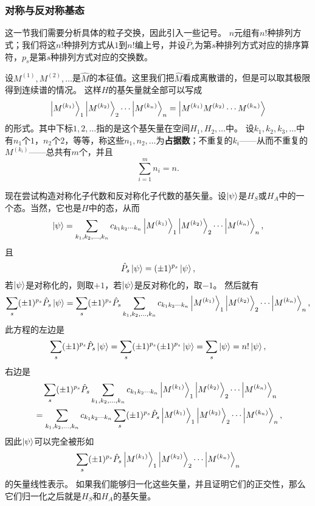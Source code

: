 \documentclass[hyperref, UTF8, a4paper]{ctexart}
\begin{document}
\subsubsection{对称与反对称基态}

这一节我们需要分析具体的粒子交换，因此引入一些记号。
$n$元组有$n!$种排列方式；我们将这$n!$种排列方式从$1$到$n!$编上号，并设$\hat{P}_s$为第$s$种排列方式对应的排序算符，$p_s$是第$s$种排列方式对应的交换数。

设$M^{(1)}, M^{(2)}, \ldots$是$\hat{M}$的本征值。这里我们把$\hat{M}$看成离散谱的，但是可以取其极限得到连续谱的情况。
这样$H$的基矢量就全部可以写成
\[
    \ket{M^{(k_1)}}_1 \ket{M^{(k_2)}}_2 \cdots \ket{M^{(k_n)}}_n = \ket{M^{(k_1)} M^{(k_2)} \cdots M^{(k_n)}}
\]
的形式。其中下标$1, 2, \ldots$指的是这个基矢量在空间$H_1, H_2, \ldots$中。
设$k_1, k_2, k_3, \ldots$中有$n_1$个$1$，$n_2$个$2$，等等，称这些$n_1, n_2, \ldots$为\textbf{占据数}；不重复的$k_i$——从而不重复的$M^{(k_i)}$——总共有$m$个，并且
\begin{equation}
    \sum_{i=1}^m n_i = n.
\end{equation}

现在尝试构造对称化子代数和反对称化子代数的基矢量。设$\ket{\psi}$是$H_S$或$H_A$中的一个态。当然，它也是$H$中的态，从而
\[
    \ket{\psi} = \sum_{k_1, k_2, \ldots, k_n} c_{k_1 k_2 \cdots k_n} \ket{M^{(k_1)}}_1 \ket{M^{(k_2)}}_2 \cdots \ket{M^{(k_n)}}_n,
\]
且
\[
    \hat{P}_s \ket{\psi} = (\pm 1)^{p_s} \ket{\psi},
\]
若$\ket{\psi}$是对称化的，则取$+1$，若$\ket{\psi}$是反对称化的，取$-1$。
然后就有
\[
    \sum_s (\pm 1)^{p_s} \hat{P}_s \ket{\psi} = \sum_s (\pm 1)^{p_s} \hat{P}_s \sum_{k_1, k_2, \ldots, k_n} c_{k_1 k_2 \cdots k_n} \ket{M^{(k_1)}}_1 \ket{M^{(k_2)}}_2 \cdots \ket{M^{(k_n)}}_n,
\]
此方程的左边是
\[
    \sum_s (\pm 1)^{p_s} \hat{P}_s \ket{\psi} = \sum_s (\pm 1)^{p_s} (\pm 1)^{p_s} \ket{\psi} = \sum_s \ket{\psi} = n! \ket{\psi},
\]
右边是
\[
    \begin{aligned}
        &\quad \sum_s (\pm 1)^{p_s} \hat{P}_s \sum_{k_1, k_2, \ldots, k_n} c_{k_1 k_2 \cdots k_n} \ket{M^{(k_1)}}_1 \ket{M^{(k_2)}}_2 \cdots \ket{M^{(k_n)}}_n \\
        &= \sum_{k_1, k_2, \ldots, k_n} c_{k_1 k_2 \cdots k_n} \sum_s (\pm 1)^{p_s} \hat{P}_s \ket{M^{(k_1)}}_1 \ket{M^{(k_2)}}_2 \cdots \ket{M^{(k_n)}}_n,
    \end{aligned}
\]
因此$\ket{\psi}$可以完全被形如
\[
    \sum_s (\pm 1)^{p_s} \hat{P}_s \ket{M^{(k_1)}}_1 \ket{M^{(k_2)}}_2 \cdots \ket{M^{(k_n)}}_n
\]
的矢量线性表示。
如果我们能够归一化这些矢量，并且证明它们的正交性，那么它们归一化之后就是$H_S$和$H_A$的基矢量。
\end{document}
